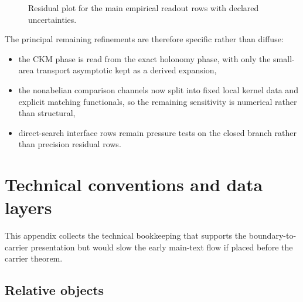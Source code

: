\documentclass[11pt,a4paper]{article}
\theoremstyle{definition}
\theoremstyle{remark}
\begin{document}
\begin{figure}[t]
\centering
{}
\caption{Residual plot for the main empirical readout rows with declared uncertainties.}
\label{fig:residual-plot}
\end{figure}

The principal remaining refinements are therefore specific rather than diffuse:
\begin{itemize}[leftmargin=1.5em, topsep=3pt, itemsep=2pt]
    \item the CKM phase is read from the exact holonomy phase, with only the small-area transport asymptotic kept as a derived expansion,
    \item the nonabelian comparison channels now split into fixed local kernel data and explicit matching functionals, so the remaining sensitivity is numerical rather than structural,
    \item direct-search interface rows remain pressure tests on the closed branch rather than precision residual rows.
\end{itemize}

\section{Technical conventions and data layers}
\label{app:tech}

This appendix collects the technical bookkeeping that supports the boundary-to-carrier presentation but would slow the early main-text flow if placed before the carrier theorem.

\subsection{Relative objects}
\end{document}
